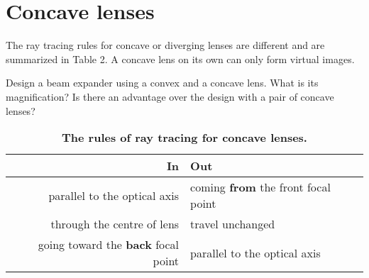 \documentclass{article}
\newcommand{\nexercise}[0]{\arabic{exercises}\addtocounter{exercises}{1}}
\begin{document}
\section{Concave lenses}
The ray tracing rules for concave or diverging lenses are different and are summarized in Table 2. A concave lens on its own can only form virtual images.

\begin{exercisebox}[frametitle={Exercise \nexercise: Beam expander with a concave lens}]
Design a beam expander using a convex and a concave lens. What is its magnification? Is there an advantage over the design with a pair of concave lenses?
\end{exercisebox}
\begin{table}[b]
\centering
\begin{tabularx}{1\textwidth}{r | l}
\toprule
\textbf{In} & \textbf{Out}
\\ \midrule
parallel to the optical axis & coming \textbf{from} the front focal point \\
through the centre of lens & travel unchanged \\
going toward the \textbf{back} focal point & parallel to the optical axis \\
\bottomrule
\end{tabularx}
\label{tbl:concave}
\caption{
{\bf The rules of ray tracing for concave lenses.}}
\end{table}
\end{document}
